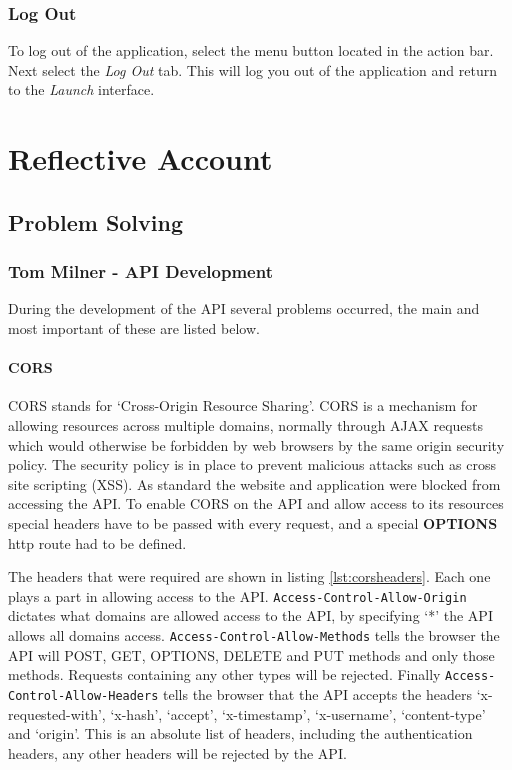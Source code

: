 \documentclass[11pt,a4paper]{report}
\begin{document}
\subsection{Log Out}
\label{log_out}

To log out of the application, select the menu button located in the action bar. Next select the \emph{Log Out} tab. This will log you out of the application and return to the \emph{Launch} interface.



\chapter{Reflective Account}
\label{sec:reflective-account}

\section{Problem Solving}
\label{sec:problem-solving}

\subsection{Tom Milner - API Development}
During the development of the API several problems occurred, the main and most important of these are listed below.

\subsubsection{CORS}
CORS stands for `Cross-Origin Resource Sharing'. CORS is a mechanism for allowing resources across multiple domains, normally through AJAX requests which would otherwise be forbidden by web browsers by the same origin security policy. The security policy is in place to prevent malicious attacks such as cross site scripting (XSS). As standard the website and application were blocked from accessing the API. To enable CORS on the API and allow access to its resources special headers have to be passed with every request, and a special \textbf{OPTIONS} http route had to be defined. 

The headers that were required are shown in listing \ref{lst:corsheaders}. Each one plays a part in allowing access to the API. \lstinline$Access-Control-Allow-Origin$ dictates what domains are allowed access to the API, by specifying `*' the API allows all domains access. \lstinline$Access-Control-Allow-Methods$ tells the browser the API will POST, GET, OPTIONS, DELETE and PUT methods and only those methods. Requests containing any other types will be rejected. Finally \lstinline$Access-Control-Allow-Headers$ tells the browser that the API accepts the headers `x-requested-with', `x-hash', `accept', `x-timestamp', `x-username', `content-type' and `origin'. This is an absolute list of headers, including the authentication headers, any other headers will be rejected by the API. 
\end{document}
